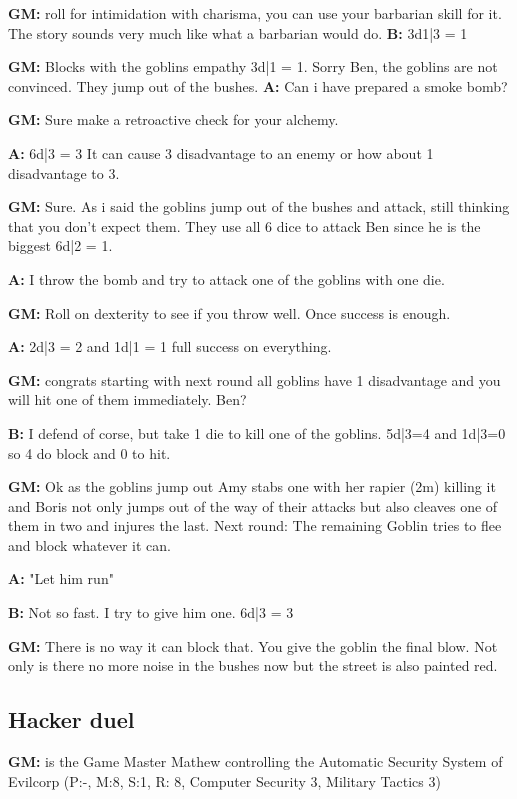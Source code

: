 \documentclass[11pt]{article}
\begin{document}
{\begin{multicols}{2}[]
\textbf{GM:} roll for intimidation with charisma, you can use your barbarian skill for it. The story sounds very much like what a barbarian would do.
\textbf{B:} 3d1|3 = 1

\textbf{GM:} Blocks with the goblins empathy 3d|1 = 1. Sorry Ben, the goblins are not convinced. They jump out of the bushes.
\textbf{A:} Can i have prepared a smoke bomb?

\textbf{GM:} Sure make a retroactive check for your alchemy.

\textbf{A:} 6d|3 = 3 It can cause 3 disadvantage to an enemy or how about 1 disadvantage to 3.

\textbf{GM:} Sure. As i said the goblins jump out of the bushes and attack, still thinking that you don't expect them. They use all 6 dice to attack Ben since he is the biggest 6d|2 = 1.

\textbf{A:} I throw the bomb and try to attack one of the goblins with one die.

\textbf{GM:} Roll on dexterity to see if you throw well. Once success is enough.

\textbf{A:} 2d|3 = 2 and 1d|1 = 1 full success on everything. 

\textbf{GM:} congrats starting with next round all goblins have 1 disadvantage and you will hit one of them immediately. Ben?

\textbf{B:} I defend of corse, but take 1 die to kill one of the goblins. 5d|3=4 and 1d|3=0 so 4 do block and 0 to hit.

\textbf{GM:} Ok as the goblins jump out Amy stabs one with her rapier (2m) killing it and Boris not only jumps out of the way of their attacks but also cleaves one of them in two and injures the last. Next round: The remaining Goblin tries to flee and block whatever it can.

\textbf{A:} "Let him run"

\textbf{B:} Not so fast. I try to give him one. 6d|3 = 3

\textbf{GM:} There is no way it can block that. You give the goblin the final blow. Not only is there no more noise in the bushes now but the street is also painted red.

\subsection{Hacker duel}
\label{sec:org365d1fc}

\textbf{GM:} is the Game Master Mathew controlling the Automatic Security System of Evilcorp (P:-, M:8, S:1, R: 8, Computer Security 3, Military Tactics 3)


\end{multicols}}
\end{document}
